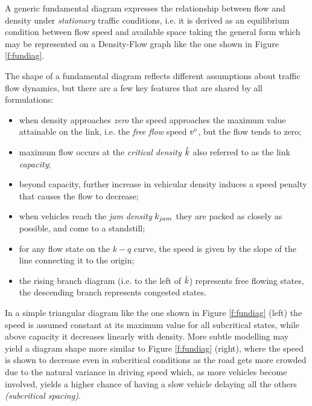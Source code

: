 A generic fundamental diagram expresses the relationship between flow and density under \emph{stationary} traffic conditions, i.e. it is derived as an equilibrium condition between flow speed and available space taking the general form
which may be represented on a Density-Flow graph like the one shown in Figure \ref{f:fundiag}.

The shape of a fundamental diagram reflects different assumptions about traffic flow dynamics, but there are a few key features that are shared by all formulations:
\begin{itemize}
\item when density approaches \emph{zero} the speed approaches the maximum value attainable on the link, i.e. the \emph{free flow} speed $v^{\scriptscriptstyle{0}}$, but the flow tends to zero;
\item maximum flow occurs at the \emph{critical density $\hat{k}$} also referred to as the link \emph{capacity};
\item beyond capacity, further increase in vehicular density induces a speed penalty that causes the flow to decrease;
\item when vehicles reach the \emph{jam density} $k_{jam}$ they are packed as closely as possible, and come to a standstill;
\item for any flow state on the $k-q$ curve, the speed is given by the slope of the line connecting it to the origin;
\item the rising branch diagram (i.e. to the left of $\hat{k}$) represents free flowing 
states, the descending branch represents congested states.
\end{itemize}

In a simple triangular diagram like the one shown in Figure \ref{f:fundiag} (left) the speed is assumed constant at its maximum value for all subcritical states, while above capacity it decreases linearly with density. More subtle modelling may yield a diagram shape more similar to Figure \ref{f:fundiag} (right), where the speed is shown to decrease even in subcritical conditions as the road gets more crowded due to the natural variance in driving speed which, as more vehicles become involved, yields a higher chance of having a slow vehicle delaying all the others \emph{(subcritical spacing)}.

